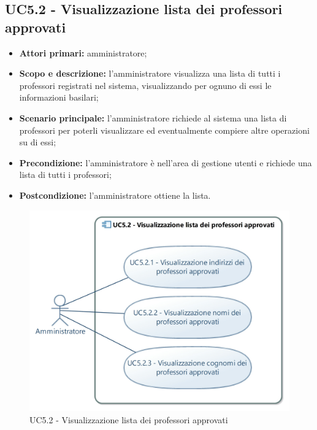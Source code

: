 \documentclass[AnalisiDeiRequisiti.tex]{subfiles}
\begin{document}
\subsection{UC5.2 - Visualizzazione lista dei professori approvati}
\begin{itemize}
	\item \textbf{Attori primari:} amministratore;
	\item \textbf{Scopo e descrizione:} l'amministratore visualizza una lista di tutti i professori registrati nel sistema, visualizzando per ognuno di essi le informazioni basilari;
	\item \textbf{Scenario principale:} l'amministratore richiede al sistema una lista di professori per poterli visualizzare ed eventualmente compiere altre operazioni su di essi;
	\item \textbf{Precondizione:} l'amministratore è nell'area di gestione utenti e richiede una lista di tutti i professori; 
	\item \textbf{Postcondizione:} l'amministratore ottiene la lista.
\end{itemize}
\begin{figure}[H]
	\centering
	\includegraphics[width=0.8\linewidth]{UC5_2.jpg}
	\caption{UC5.2 - Visualizzazione lista dei professori approvati}
	\label{fig:UC5.2 - Visualizzazione lista dei professori approvati}
\end{figure}
\end{document}
